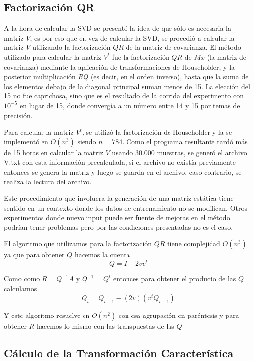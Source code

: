\subsection{Factorizaci\'on QR}
A la hora de calcular la SVD se present\'o la idea de que s\'olo es necesaria la matriz $V$, es por
eso que en vez de calcular la SVD, se procedi\'o a calcular la matriz $V$ utilizando la factorizaci\'on
$QR$ de la matriz de covarianza. El m\'etodo utilizado para calcular la matriz $V^t$ fue la factorizaci\'on
$QR$ de $Mx$ (la matriz de covarianza) mediante la aplicaci\'on de transformaciones de Householder, y la
posterior multiplicaci\'on $RQ$ (es decir, en el orden inverso), hasta que la suma de los elementos debajo
de la diagonal principal suman menos de 15. La elecci\'on del 15 no fue caprichosa, sino que es el
resultado de la corrida del experimento con $10^{-5}$ en lugar de 15, donde converg\'ia a un n\'umero
entre 14 y 15 por temas de precisi\'on.

Para calcular la matriz $V^t$, se utiliz\'o la factorizaci\'on de Householder y la se implement\'o en $O(n^3)$
siendo $n = 784$. Como el programa resultante tard\'o m\'as de 15 horas en calcular la matriz $V$ usando 30.000 muestras,
se gener\'o el archivo V.txt con esta informaci\'on precalculada, si el archivo no exist\'ia previamente
entonces se genera la matriz y luego se guarda en el archivo, caso contrario, se realiza la lectura del archivo.

Este procedimiento que involucra la generaci\'on de una matriz est\'atica tiene sentido en un contexto
donde los datos de entrenamiento no se modifican. Otros experimentos donde nuevo input puede ser fuente de mejoras
en el m\'etodo podr\'ian tener problemas pero por las condiciones presentadas no es el caso.

El algoritmo que utilizamos para la factorizaci\'on $QR$ tiene complejidad $O(n^3)$ ya que para obtener $Q$ hacemos la cuenta
$$Q = I - 2vv^t$$

Como como $R = Q^{-1}A$ y $Q^{-1} = Q^t$ entonces para obtener el producto de
las $Q$ calculamos
$$Q_i = Q_{i-1} - (2v)(v^t Q_{i-1})$$

Y este algoritmo resuelve en $O(n^2)$ con esa agrupaci\'on en par\'entesis y para 
obtener $R$ hacemos lo mismo con las transpuestas de las $Q$

\subsection{C\'alculo de la Transformaci\'on Caracter\'istica}

